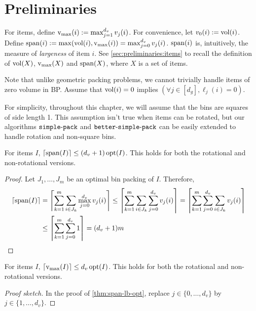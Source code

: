 \section{Preliminaries}
\label{sec:gvbp-prelims}

For  items,
define $\operatorname{v_{\max}}(i) := \max_{j=1}^{d_v} v_j(i)$.
For convenience, let $v_0(i) := \operatorname{vol}(i)$.
Define $\operatorname{span}(i) := \max(\operatorname{vol}(i), \operatorname{v_{\max}}(i)) = \max_{j=0}^{d_v} v_j(i)$.
$\operatorname{span}(i)$ is, intuitively, the measure of \emph{largeness} of item $i$.
See \cref{sec:preliminaries:items} to recall the definition of
$\operatorname{vol}(X)$, $\operatorname{v_{\max}}(X)$ and $\operatorname{span}(X)$,
where $X$ is a set of  items.

Note that unlike geometric packing problems,
we cannot trivially handle items of zero volume in  BP.
Assume \wLoG{} that $\operatorname{vol}(i) = 0$ implies $(\forall j \in [d_g], \ell_j(i) = 0)$.

For simplicity, throughout this chapter, we will assume that the bins are squares of side length 1.
This assumption isn't true when items can be rotated, but our algorithms
$\operatorname{\mathtt{simple-pack}}$ and $\operatorname{\mathtt{better-simple-pack}}$ can be easily extended to handle
rotation and non-square bins.

\begin{lemma}
\label{thm:span-lb-opt}
For  items $I$, $\left\lceil \operatorname{span}(I) \right\rceil \le (d_v+1)\operatorname{opt}(I)$.
This holds for both the rotational and non-rotational versions.
\end{lemma}
\begin{proof}
Let $J_1, \ldots, J_m$ be an optimal bin packing of $I$. Therefore,
\begin{align*}
\left\lceil \operatorname{span}(I) \right\rceil &= \left\lceil \sum_{k=1}^m \sum_{i \in J_k} \max_{j=0}^{d_v} v_j(i) \right\rceil
\le \left\lceil \sum_{k=1}^m \sum_{i \in J_k} \sum_{j=0}^{d_v} v_j(i) \right\rceil
= \left\lceil \sum_{k=1}^m \sum_{j=0}^{d_v} \sum_{i \in J_k} v_j(i) \right\rceil
\\ &\le \left\lceil \sum_{k=1}^m \sum_{j=0}^{d_v} 1 \right\rceil
= (d_v+1)m  \qedhere
\end{align*}
\end{proof}

\begin{lemma}
\label{lem:vmax-lb-opt}
For  items $I$, $\left\lceil \operatorname{v_{\max}}(I) \right\rceil \le d_v\operatorname{opt}(I)$.
This holds for both the rotational and non-rotational versions.
\end{lemma}
\begin{proof}[Proof sketch]
In the proof of \cref{thm:span-lb-opt}, replace $j \in \{0, \ldots, d_v\}$
by $j \in \{1, \ldots, d_v\}$.
\end{proof}
